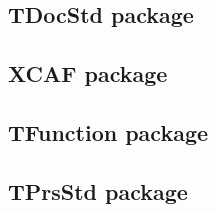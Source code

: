 \documentclass[11pt]{article}
\begin{document}
\subsection{TDocStd package}
\label{sec:orgdd63dd5}

\subsection{XCAF package}
\label{sec:org5cb4a57}

\subsection{TFunction package}
\label{sec:orgeeb867e}

\subsection{TPrsStd package}
\label{sec:org8797f23}
\end{document}
